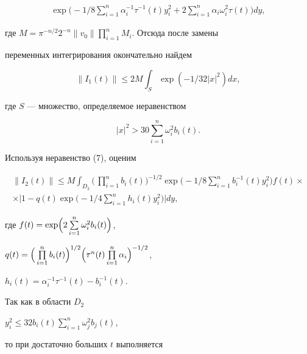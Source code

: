 \begin{pf}
\begin{multline*}
\exp\biggl(-1/8\sum^n_{i=1}\alpha^{-1}_i\tau^{-1}(t)y^2_i+ 


2\sum^n_{i=1}\alpha_i\omega^2_i\tau(t)\biggr)dy, 


\end{multline*} 


где $M=\pi^{-n/2}2^{-n}\|v_0\|\prod\limits^n_{i=1}M_i$. Отсюда после замены 


переменных интегрирования окончательно найдем 


\begin{equation} 


\|I_1(t)\| \le 2M\int_S\exp(-1/32|x|^2)dx, 


\end{equation} 


где $S$ --- множество, определяемое неравенством 


$$ 


|x|^2 > 30\sum^n_{i=1}\omega^2_ib_i(t). 


$$ 


 


Используя неравенство (7), оценим 


\begin{multline} 


\|I_2(t)\| \le M\int_{D_2}\biggl(\,\prod^n_{i=1}b_i(t)\biggr)^{-1/2} 


\exp\biggl(-1/8\sum^n_{i=1}b^{-1}_i(t)y^2_i\biggr)f(t)\times \\ 


\times \biggl|1-q(t)\exp\biggl(-1/4\sum^n_{i=1}h_i(t)y^2_i\biggr)\biggr|dy,


\end{multline} 


где $f(t)=\exp\Bigl(2\sum\limits^n_{i=1}\omega^2_i b_i(t)\Bigr)$, 


$q(t)=\Bigl(\,\prod\limits^n_{i=1}b_i(t)\Bigr)^{1/2} 


\Bigl(\tau^n(t)\prod\limits^n_{i=1}\alpha_i\Bigr)^{-1/2}$, 


$h_i(t)=\alpha^{-1}_i\tau^{-1}(t)-b^{-1}_i(t)$. 


 


Так как в области $D_2$ 


$y^2_i\le 32b_i(t)\sum\limits^n_{i=1}\omega^2_jb_j(t)$, 


то при достаточно больших $t$ выполняется 


\begin{multline} 



\end{multline}
\end{pf}
